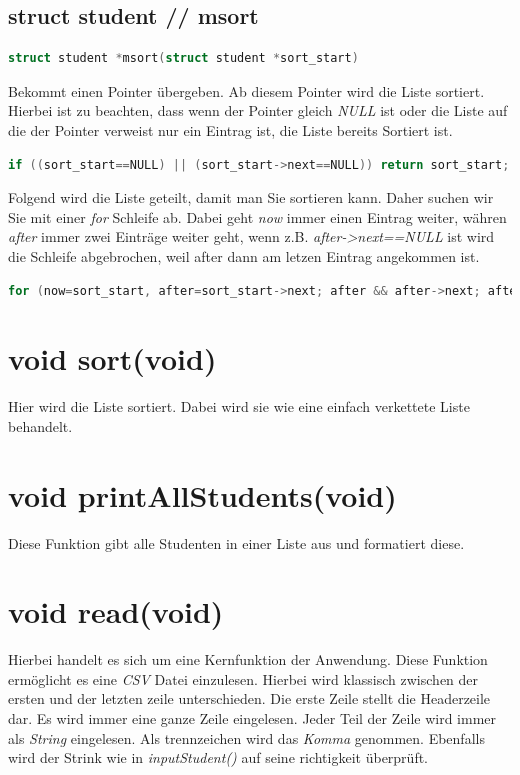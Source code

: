 \documentclass[a4paper, 11pt, oneside]{book} %
\begin{document}
\subsection{struct student // msort}
\begin{lstlisting}[language=C]
	struct student *msort(struct student *sort_start)
\end{lstlisting}
Bekommt einen Pointer übergeben. Ab diesem Pointer wird die Liste sortiert. Hierbei ist zu beachten, dass wenn der Pointer gleich \textit{NULL} ist oder die Liste auf die der Pointer verweist nur ein Eintrag ist, die Liste bereits Sortiert ist.
\begin{lstlisting}[language=C]
	if ((sort_start==NULL) || (sort_start->next==NULL)) return sort_start;
\end{lstlisting}
Folgend wird die Liste geteilt, damit man Sie sortieren kann. Daher suchen wir Sie mit einer \textit{for} Schleife ab. Dabei geht \textit{now} immer einen Eintrag weiter, währen \textit{after} immer zwei Einträge weiter geht, wenn z.B. \textit{after->next==NULL} ist wird die Schleife abgebrochen, weil after dann am letzen Eintrag angekommen ist.
\begin{lstlisting}[language=C]
	for (now=sort_start, after=sort_start->next; after && after->next; after=after->next->next) now=now->next;
\end{lstlisting}

\section{void sort(void)}
Hier wird die Liste sortiert. Dabei wird sie wie eine einfach verkettete Liste behandelt.
\section{void printAllStudents(void)}
Diese Funktion gibt alle Studenten in einer Liste aus und formatiert diese.

\section{void read(void)}
Hierbei handelt es sich um eine Kernfunktion der Anwendung. Diese Funktion ermöglicht es eine \textit{CSV} Datei einzulesen. Hierbei wird klassisch zwischen der ersten und der letzten zeile unterschieden. Die erste Zeile stellt die Headerzeile dar. Es wird immer eine ganze Zeile eingelesen. Jeder Teil der Zeile wird immer als \textit{String} eingelesen. Als trennzeichen wird das \textit{Komma} genommen. Ebenfalls wird der Strink wie in \textit{inputStudent()} auf seine richtigkeit überprüft.
\end{document}
